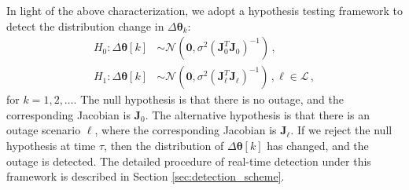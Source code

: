 In light of the above characterization, we adopt a hypothesis testing framework to detect the distribution change in $\Delta\boldsymbol{\theta}_k$:
\begin{subequations}
\label{eqn:pre_post_distribution}
\begin{align}
     H_0: \Delta\boldsymbol{\theta}[k] &\sim \mathcal{N}(\boldsymbol{0}, \sigma^2 (\mathbf{J}_0^T \mathbf{J}_0)^{-1}) \,,  \label{eqn:pre_distribution}\\
     H_1: \Delta\boldsymbol{\theta}[k] &\sim \mathcal{N}(\boldsymbol{0}, \sigma^2 (\mathbf{J}_{\ell}^T \mathbf{J}_{\ell})^{-1}) \,, \ell \in \mathcal{L} \,, \label{eqn:post_distribution}
\end{align}
 \end{subequations}
for $k = 1, 2, \dots$. The null hypothesis is that there is no outage, and the corresponding Jacobian is $\mathbf{J}_0$. The alternative hypothesis is that there is an outage scenario $\ell$, where the corresponding Jacobian is $\mathbf{J}_{\ell}$. If we reject the null hypothesis at time $\tau$, then the distribution of $\Delta\boldsymbol{\theta}[k]$ has changed, and the outage is detected. The detailed procedure of real-time detection under this framework is described in Section \ref{sec:detection_scheme}.


